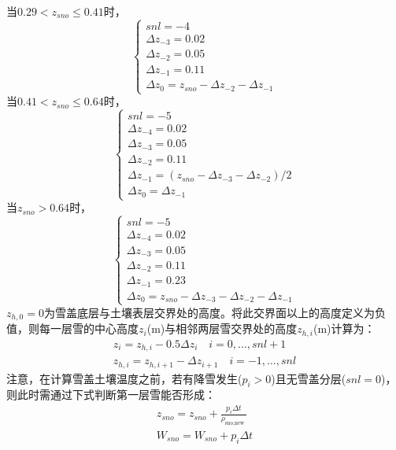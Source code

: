 当$0.29<z_{sno}\le0.41$时，
\begin{equation}
\left\{\begin{array}{c}s n l=-4 \\ \Delta z_{-3}=0.02 \\ \Delta z_{-2}=0.05 \\ \Delta z_{-1}=0.11 \\ \Delta z_{0}=z_{sno}-\Delta z_{-2}-\Delta z_{-1}\end{array}\right.
\end{equation}
当$0.41<z_{sno}\le0.64$时，
\begin{equation}
\left\{\begin{array}{c}s n l=-5 \\ \Delta z_{-4}=0.02 \\ \Delta z_{-3}=0.05 \\ \Delta z_{-2}=0.11 \\ \Delta z_{-1}=\left(z_{sno}-\Delta z_{-3}-\Delta z_{-2}\right) / 2 \\ \Delta z_{0}=\Delta z_{-1}\end{array}\right.
\end{equation}
当$z_{sno}>0.64$时，
\begin{equation}
\left\{\begin{array}{c}s n l=-5 \\ \Delta z_{-4}=0.02 \\ \Delta z_{-3}=0.05 \\ \Delta z_{-2}=0.11 \\ \Delta z_{-1}=0.23 \\ \Delta z_{0}=z_{sno}-\Delta z_{-3}-\Delta z_{-2}-\Delta z_{-1}\end{array}\right.
\end{equation}
$z_{h,0}=0$为雪盖底层与土壤表层交界处的高度。将此交界面以上的高度定义为负值，则每一层雪的中心高度$z_i$(m)与相邻两层雪交界处的高度$z_{h,i}$(m)计算为：
\begin{equation}
\begin{array}{l}z_{i}=z_{h, i}-0.5 \Delta z_{i} \quad i=0, \ldots, s n l+1 \\ z_{h, i}=z_{h, i+1}-\Delta z_{i+1} \quad i=-1, \ldots, s n l\end{array}
\end{equation}
注意，在计算雪盖土壤温度之前，若有降雪发生($p_i>0$)且无雪盖分层($snl=0$)，则此时需通过下式判断第一层雪能否形成：
\begin{equation}
\begin{array}{c}z_{sno}=z_{sno}+\frac{p_{i} \Delta t}{\rho_{\text {sno,new }}} \\ W_{sno}=W_{sno}+p_{i} \Delta t\end{array}
\end{equation}
